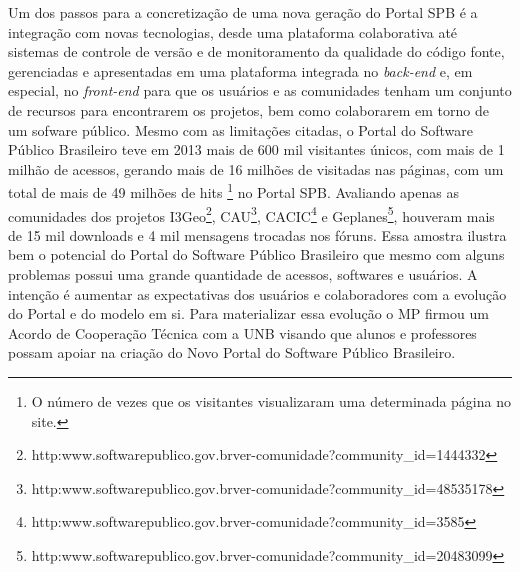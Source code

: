 Um dos passos para a concretização de uma nova geração do Portal SPB é a
integração com novas tecnologias, desde uma plataforma colaborativa até sistemas
de controle de versão e de monitoramento da qualidade do código fonte,
gerenciadas e apresentadas em uma plataforma integrada no {\it back-end} e, em especial,
no {\it front-end} para que os usuários e as comunidades tenham um conjunto de
recursos para encontrarem os projetos, bem como colaborarem em torno de um
sofware público.
%
Mesmo com as limitações citadas, o Portal do Software Público Brasileiro teve
em 2013 mais de 600 mil visitantes únicos, com mais de 1 milhão de acessos,
gerando mais de 16 milhões de visitadas nas páginas, com um total de mais de 49
milhões de hits \footnote{O número de vezes que os visitantes visualizaram uma
determinada página no site.} no Portal SPB.
%
Avaliando apenas as comunidades dos projetos I3Geo\footnote{http:\/\/www.softwarepublico.gov.br\/ver-comunidade?community\_id=1444332}, CAU\footnote{http:\/\/www.softwarepublico.gov.br\/ver-comunidade?community\_id=48535178}, CACIC\footnote{http:\/\/www.softwarepublico.gov.br\/ver-comunidade?community\_id=3585} e Geplanes\footnote{http:\/\/www.softwarepublico.gov.br\/ver-comunidade?community\_id=20483099}, houveram
mais de 15 mil downloads e 4 mil mensagens trocadas nos fóruns.
%
Essa amostra ilustra bem o potencial do Portal do Software Público Brasileiro que mesmo com alguns problemas possui uma grande quantidade de acessos, softwares e usuários. A intenção é aumentar as expectativas dos usuários e colaboradores com a evolução do Portal e
do modelo em si. Para materializar essa evolução o MP firmou um Acordo de Cooperação Técnica com a UNB visando que alunos e professores possam apoiar na criação do Novo Portal do Software Público Brasileiro. 


